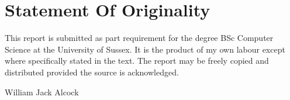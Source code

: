 \chapter{Statement Of Originality}

This report is submitted as part requirement for the degree BSc Computer Science at the University of Sussex. It is the product of my own labour except where specifically stated in the text. The report may be freely copied and distributed provided the source is acknowledged.

\vspace{3 cm}

William Jack Alcock\\
\date{\today}